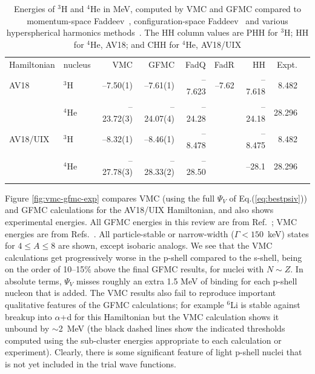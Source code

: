 \begin{table}
\caption{Energies of $^3$H and $^4$He in MeV, computed by VMC and 
GFMC compared to momentum-space Faddeev~\cite{NKG00}, 
configuration-space Faddeev~\cite{FPSS93} and various hyperspherical harmonics
methods~\cite{kievsky}.
The HH column values are PHH for $^3$H; HH for $^4$He, 
AV18; and CHH for $^4$He, AV18/UIX}
\label{tab:s-shell}
\begin{tabular}{llrrrrrrr}
\toprule
 Hamiltonian & nucleus &   VMC     &   GFMC    & FadQ     & FadR     & HH     & Expt. \\
\colrule
 AV18        & $^3$H   & --7.50(1) & --7.61(1) & --7.623  &--7.62    &--7.618 &  8.482 \\
             & $^4$He  &--23.72(3) &--24.07(4) &--24.28   &          &--24.18 & 28.296\\
\colrule                                                            
 AV18/UIX    & $^3$H   & --8.32(1) & --8.46(1) & --8.478  &          &--8.475 &  8.482 \\
             & $^4$He  &--27.78(3) &--28.33(2) &--28.50   &          &--28.1  & 28.296 \\
\botrule
\end{tabular}
\end{table}

Figure \ref{fig:vmc-gfmc-exp} compares VMC (using the full $\Psi_V$ of
Eq.(\ref{eq:bestpsiv})) and GFMC calculations for the AV18/UIX
Hamiltonian, and also shows experimental energies.
All GFMC energies in this review are from Ref.~\cite{PPWC01};
VMC energies are from Refs.~\cite{WPCP00,PPCPW97}.
All particle-stable or narrow-width ($\Gamma<150$~keV)
states for $4\leq{A}\leq8$ are shown, except isobaric analogs.
We see that the VMC calculations get progressively worse 
in the p-shell compared to the s-shell, being on the order of 10--15\% above
the final GFMC results, for nuclei with $N \sim Z$.
In absolute terms, $\Psi_V$ misses roughly an extra 1.5 MeV of binding for
each p-shell nucleon that is added.
The VMC results also fail to reproduce important qualitative features
of the GFMC calculations; for example $^6$Li is stable against
breakup into $\alpha$+d for this Hamiltonian but the VMC calculation
shows it unbound by $\sim$2~MeV
(the black dashed lines show the 
indicated thresholds computed using the sub-cluster energies appropriate
to each calculation or experiment).
Clearly, there is some significant feature of light p-shell nuclei that 
is not yet included in the trial wave functions.

